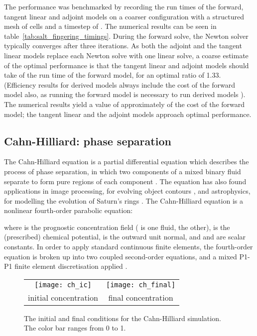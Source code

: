 \documentclass{siamltex}
\begin{document}
The performance was benchmarked by recording the run times of the forward, tangent linear and
adjoint models on a coarser configuration with a structured mesh of  cells and a timestep of
.  The numerical results can be seen in table~\ref{tab:salt_fingering_timings}.
During the forward solve, the Newton solver typically converges after three iterations.  As both the
adjoint and the tangent linear models replace each Newton solve with one linear solve, a coarse
estimate of the optimal performance is that the tangent linear and adjoint models should take 
of the run time of the forward model, for an optimal ratio of 1.33. (Efficiency results for derived
models always include the cost of the forward model also, as running the forward model is necessary
to run derived models \citep{naumann2011}).  The numerical results yield a value of approximately  of
the cost of the forward model; the tangent linear and the adjoint models approach
optimal performance.

\subsection{Cahn-Hilliard: phase separation}
The Cahn-Hilliard equation is a partial differential equation which describes the process of phase separation, in which
two components of a mixed binary fluid separate to form pure regions of each component \cite{cahn1958}. The equation
has also found applications in image processing, for evolving object contours \cite{capuzzo2002}, and astrophysics,
for modelling the evolution of Saturn's rings \cite{tremaine2003}. The Cahn-Hilliard equation is a nonlinear fourth-order
parabolic equation:

where  is the prognostic concentration field ( is one fluid,  the other),  is the (prescribed) chemical potential,  is the outward unit normal, and
 and  are scalar constants. In order to apply standard continuous finite elements, the fourth-order equation is broken up
into two coupled second-order equations, and a mixed P1-P1 finite element discretisation applied \cite{wells2006}.

\begin{figure}
  \centering
  \begin{tabular}{cc}
    \texttt{[image: ch\_ic]} & \texttt{[image: ch\_final]}
    \\
    initial concentration & final concentration
  \end{tabular}
  \caption{The initial and final conditions for the Cahn-Hilliard simulation. The color bar ranges from 0 to 1.}
  \label{fig:ch_conditions}
\end{figure}
\end{document}

